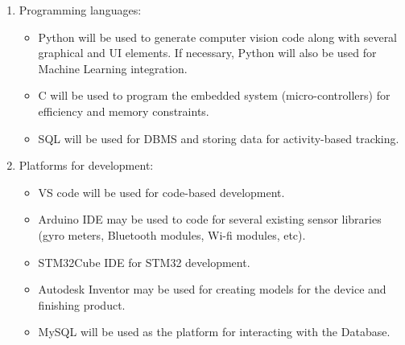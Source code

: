 \documentclass[12pt]{article}
\begin{document}
\begin{enumerate}
\item Programming languages:
\begin{itemize}
\item Python will be used to generate computer vision code along with several graphical and UI elements. If necessary, Python will also be used for Machine Learning integration.
\item C will be used to program the embedded system (micro-controllers) for efficiency and memory constraints.
\item SQL will be used for DBMS and storing data for activity-based tracking.
\end{itemize}
\item Platforms for development:
\begin{itemize}
\item VS code will be used for code-based development.
\item Arduino IDE may be used to code for several existing sensor libraries (gyro meters, Bluetooth modules, Wi-fi modules, etc).
\item STM32Cube IDE for STM32 development. 
\item Autodesk Inventor may be used for creating models for the device and finishing product.
\item MySQL will be used as the platform for interacting with the Database.\\
\end{itemize}


\end{enumerate}
\end{document}
